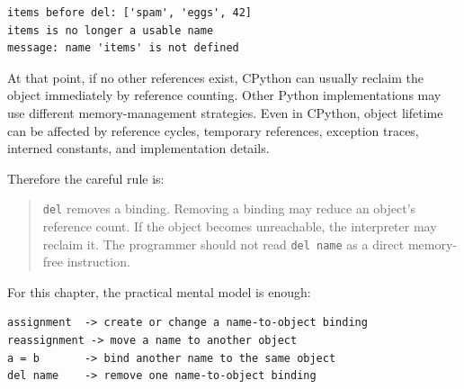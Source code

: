 \begin{verbatim}
items before del: ['spam', 'eggs', 42]
items is no longer a usable name
message: name 'items' is not defined
\end{verbatim}

At that point, if no other references exist, CPython can usually reclaim the object immediately by reference counting. Other Python implementations may use different memory-management strategies. Even in CPython, object lifetime can be affected by reference cycles, temporary references, exception traces, interned constants, and implementation details.

Therefore the careful rule is:

\begin{quote}
\texttt{del} removes a binding. Removing a binding may reduce an object's reference count. If the object becomes unreachable, the interpreter may reclaim it. The programmer should not read \texttt{del name} as a direct memory-free instruction.
\end{quote}

For this chapter, the practical mental model is enough:

\begin{verbatim}
assignment  -> create or change a name-to-object binding
reassignment -> move a name to another object
a = b       -> bind another name to the same object
del name    -> remove one name-to-object binding
\end{verbatim}